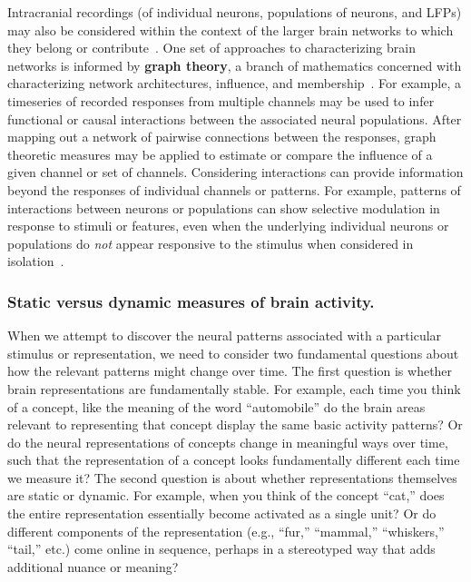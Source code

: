 \documentclass{llmxive}
\begin{document}
Intracranial recordings (of individual neurons, populations of
neurons, and LFPs) may also be considered within the context of the
larger brain networks to which they belong or
contribute~\citep{BassSpor17}.  One set of approaches to
characterizing brain networks is informed by \textbf{graph theory}, a
branch of mathematics concerned with characterizing network
architectures, influence, and membership~\citep{BullSpor09,
  RubiSpor10, HoneEtal07, SporBetz16, SporHone06, BassBull06,
  BetzEtal17b, SizeEtal18, OwenEtal21}.  For example, a timeseries of
recorded responses from multiple channels may be used to infer
functional or causal interactions between the associated neural
populations.  After mapping out a network of pairwise connections
between the responses, graph theoretic measures may be applied to
estimate or compare the influence of a given channel or set of
channels.  Considering interactions can provide information beyond the
responses of individual channels or patterns.  For example, patterns
of interactions between neurons or populations can show selective
modulation in response to stimuli or features, even when the
underlying individual neurons or populations do \textit{not} appear
responsive to the stimulus when considered in
isolation~\citep{RigoEtal13}.



\subsubsection{Static versus dynamic measures of brain activity.}
When we attempt to discover the neural patterns associated with a
particular stimulus or representation, we need to consider two
fundamental questions about how the relevant patterns might change
over time.  The first question is whether brain representations are
fundamentally stable.  For example, each time you think of a concept,
like the meaning of the word ``automobile'' do the brain areas
relevant to representing that concept display the same basic activity
patterns?  Or do the neural representations of concepts change in
meaningful ways over time, such that the representation of a concept
looks fundamentally different each time we measure it?  The second
question is about whether representations themselves are static or
dynamic.  For example, when you think of the concept ``cat,'' does the
entire representation essentially become activated as a single unit?
Or do different components of the representation (e.g., ``fur,''
``mammal,'' ``whiskers,'' ``tail,'' etc.) come online in sequence,
perhaps in a stereotyped way that adds additional nuance or
meaning?
\end{document}
